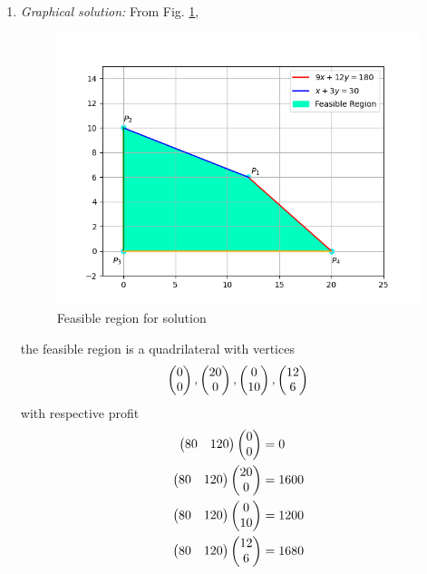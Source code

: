 \documentclass[journal,12pt,twocolumn]{IEEEtran}
\begin{document}
    \begin{enumerate}
        \item {\em Graphical solution:}
              From Fig.
              \ref{fig:plot},
              \begin{figure}[!h]
                  \centering
                  \includegraphics[width=\columnwidth]{figures/plot.png}
                  \caption{Feasible region for solution}
                  \label{fig:plot}
              \end{figure}
              the feasible region is a quadrilateral with vertices
              \begin{align}
                  \begin{pmatrix}0  \\ 0\end{pmatrix},
                  \begin{pmatrix}20 \\ 0\end{pmatrix},
                  \begin{pmatrix}0  \\ 10\end{pmatrix},
                  \begin{pmatrix}12 \\ 6\end{pmatrix}
              \end{align}
              with respective profit
              \begin{align}
                  \begin{pmatrix}80 & 120\end{pmatrix}\begin{pmatrix}0  \\ 0\end{pmatrix} &= 0 \\
                  \begin{pmatrix}80 & 120\end{pmatrix}\begin{pmatrix}20 \\ 0\end{pmatrix} &= 1600 \\
                  \begin{pmatrix}80 & 120\end{pmatrix}\begin{pmatrix}0  \\ 10\end{pmatrix} &= 1200 \\
                  \begin{pmatrix}80 & 120\end{pmatrix}\begin{pmatrix}12 \\ 6\end{pmatrix} &= 1680
              \end{align}

\end{enumerate}
\end{document}
